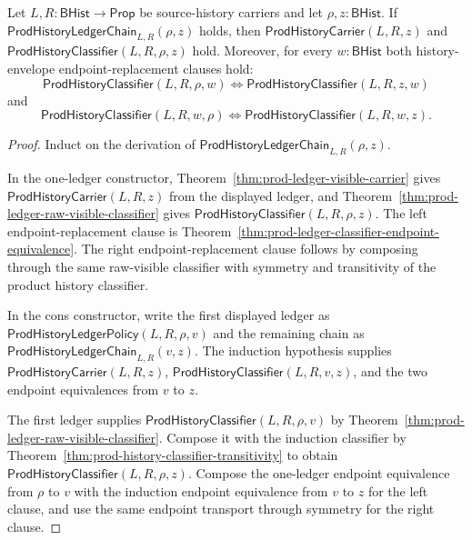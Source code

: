 \begin{theorem}
\label{thm:prod-ledger-chain-envelope-closure}
Let $L,R:\mathsf{BHist}\to\mathsf{Prop}$ be source-history carriers and let
$\rho,z:\mathsf{BHist}$. If
$\mathsf{ProdHistoryLedgerChain}_{L,R}(\rho,z)$ holds, then
$\mathsf{ProdHistoryCarrier}(L,R,z)$ and
$\mathsf{ProdHistoryClassifier}(L,R,\rho,z)$ hold. Moreover, for every
$w:\mathsf{BHist}$ both history-envelope endpoint-replacement clauses hold:
$$
\mathsf{ProdHistoryClassifier}(L,R,\rho,w)
\Longleftrightarrow
\mathsf{ProdHistoryClassifier}(L,R,z,w)
$$
and
$$
\mathsf{ProdHistoryClassifier}(L,R,w,\rho)
\Longleftrightarrow
\mathsf{ProdHistoryClassifier}(L,R,w,z).
$$
\end{theorem}
\begin{proof}
Induct on the derivation of
$\mathsf{ProdHistoryLedgerChain}_{L,R}(\rho,z)$.

In the one-ledger constructor, Theorem~\ref{thm:prod-ledger-visible-carrier}
gives $\mathsf{ProdHistoryCarrier}(L,R,z)$ from the displayed ledger, and
Theorem~\ref{thm:prod-ledger-raw-visible-classifier} gives
$\mathsf{ProdHistoryClassifier}(L,R,\rho,z)$. The left endpoint-replacement
clause is Theorem~\ref{thm:prod-ledger-classifier-endpoint-equivalence}. The
right endpoint-replacement clause follows by composing through the same
raw-visible classifier with symmetry and transitivity of the product history
classifier.

In the cons constructor, write the first displayed ledger as
$\mathsf{ProdHistoryLedgerPolicy}(L,R,\rho,v)$ and the remaining chain as
$\mathsf{ProdHistoryLedgerChain}_{L,R}(v,z)$. The induction hypothesis supplies
$\mathsf{ProdHistoryCarrier}(L,R,z)$,
$\mathsf{ProdHistoryClassifier}(L,R,v,z)$, and the two endpoint equivalences
from $v$ to $z$.

The first ledger supplies
$\mathsf{ProdHistoryClassifier}(L,R,\rho,v)$ by
Theorem~\ref{thm:prod-ledger-raw-visible-classifier}. Compose it with the
induction classifier by Theorem~\ref{thm:prod-history-classifier-transitivity}
to obtain $\mathsf{ProdHistoryClassifier}(L,R,\rho,z)$. Compose the one-ledger
endpoint equivalence from $\rho$ to $v$ with the induction endpoint
equivalence from $v$ to $z$ for the left clause, and use the same endpoint
transport through symmetry for the right clause.
\end{proof}

